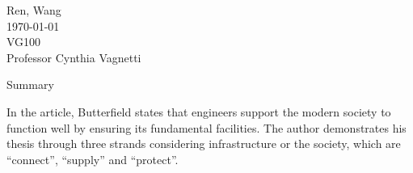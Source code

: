 \documentclass[12pt,a4]{article}
\begin{document}
\begin{flushleft}
Ren, Wang\\
\today\\
VG100\\
Professor Cynthia Vagnetti \\
\end{flushleft}

\begin{center}
Summary
\end{center}


In the article, Butterfield states that engineers support the modern society to
function well by ensuring its fundamental facilities. 
The author demonstrates his thesis through three strands considering
infrastructure or the society, which are ``connect'', ``supply'' and ``protect''.

\cite{asmemanual}
\cite{upd}
\cite{art}



\end{document}

